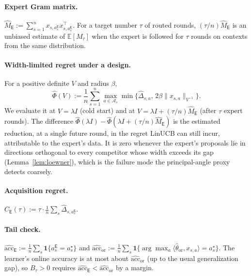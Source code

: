 \documentclass{article}
\theoremstyle{definition}
\theoremstyle{remark}
\newcommand{\E}{\mathbb{E}}
\newcommand{\ind}{\mathbf{1}}
\theoremstyle{remark}
\newcommand{\Exp}{\mathsf{E}}
\begin{document}
\paragraph{Expert Gram matrix.}
$\widehat M_{\Exp}:=\sum_{s=1}^nx_{s,a_s^{\Exp}}x_{s,a_s^{\Exp}}^\top$. For a target
number $\tau$ of routed rounds, $(\tau/n)\widehat M_{\Exp}$ is an unbiased
estimate of $\E[M_\tau]$ when the expert is followed for $\tau$ rounds on
contexts from the same distribution.

\paragraph{Width-limited regret under a design.} For a positive definite
$V$ and radius $\beta$,
\[
\widehat\Phi(V):=\frac1n\sum_{s=1}^n\max_{a\in\mathcal A_s}\min\bigl\{\widehat\Delta_{s,a},\,2\beta\|x_{s,a}\|_{V^{-1}}\bigr\}.
\]
We evaluate it at $V=\lambda I$ (cold start) and at
$V=\lambda I+(\tau/n)\widehat M_{\Exp}$ (after $\tau$ expert rounds). The
difference $\widehat\Phi(\lambda I)-\widehat\Phi(\lambda I+(\tau/n)\widehat M_{\Exp})$
is the estimated reduction, at a single future round, in the regret LinUCB
can still incur, attributable to the expert's data. It is zero whenever the
expert's proposals lie in directions orthogonal to every competitor whose
width exceeds its gap (Lemma~\ref{lem:loewner}), which is the failure mode the
principal-angle proxy detects coarsely.

\paragraph{Acquisition regret.}
$\widehat C_{\Exp}(\tau):=\tau\cdot\frac1n\sum_s\widehat\Delta_{s,a_s^{\Exp}}$.

\paragraph{Tail check.} $\widehat{\mathrm{acc}}_{\Exp}:=\frac1n\sum_s\ind\{a_s^{\Exp}=a_s^\star\}$
and $\widehat{\mathrm{acc}}_{\mathrm{or}}:=\frac1n\sum_s\ind\{\arg\max_a\langle\widehat\theta_{\mathrm{or}},x_{s,a}\rangle=a_s^\star\}$.
The learner's online accuracy is at most about $\widehat{\mathrm{acc}}_{\mathrm{or}}$
(up to the usual generalization gap), so $B_\tau>0$ requires
$\widehat{\mathrm{acc}}_{\Exp}<\widehat{\mathrm{acc}}_{\mathrm{or}}$ by a margin.
\end{document}
